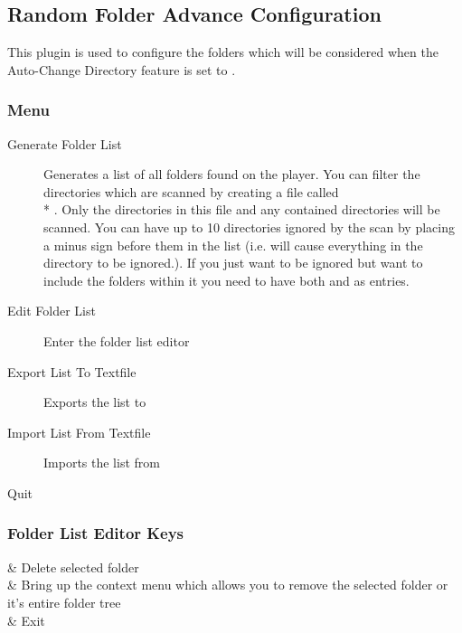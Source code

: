 \subsection{Random Folder Advance Configuration}
{\label{ref:random_folder_advance_config}}
This plugin is used to configure the folders which will be considered
when the Auto-Change Directory feature is set to .

\subsubsection{Menu}
\begin{description}
\item[Generate Folder List] Generates a list of all folders found 
on the player.  You can filter the directories which are scanned by
creating a file called \\* 
.  
Only the directories in this file and any contained directories
 will be scanned.  You can have up to 10 directories ignored by the 
 scan by placing a minus sign before them in the list 
 (i.e.  will cause everything in the  
 directory to be ignored.).  If you just want 
 to be ignored but want to include the folders within 
it you need to have both  and  as entries.
\item[Edit Folder List] Enter the folder list editor
\item[Export List To Textfile] Exports the list to 
\item[Import List From Textfile] Imports the list from
\item[Quit]
\end{description}

\subsubsection{Folder List Editor Keys}
\begin{table}
\begin{btnmap}{}{}
	\ActionStdOk{} & Delete selected folder\\
	\ActionStdContext{} & Bring up the context menu which allows you to
	remove the selected folder or it's entire folder tree\\
	\ActionStdCancel{} & Exit\\
\end{btnmap}
\end{table}
